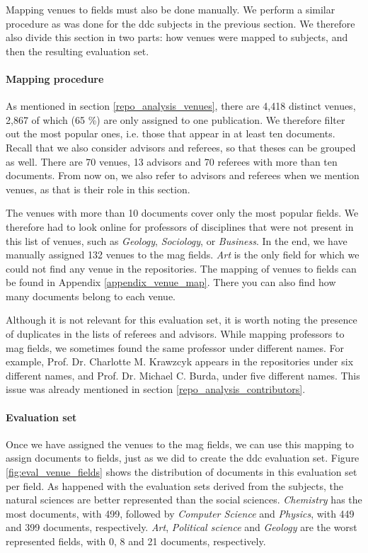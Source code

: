 Mapping venues to fields must also be done manually. We perform a similar procedure as was done for the \acrshort{ddc} subjects in the previous section. We therefore also divide this section in two parts: how venues were mapped to subjects, and then the resulting evaluation set.

\paragraph{Mapping procedure} \mbox{}

As mentioned in section \ref{repo_analysis_venues}, there are 4,418 distinct venues, 2,867 of which (65 \%) are only assigned to one publication. We therefore filter out the most popular ones, i.e. those that appear in at least ten documents. Recall that we also consider advisors and referees, so that theses can be grouped as well. There are 70 venues, 13 advisors and 70 referees with more than ten documents. From now on, we also refer to advisors and referees when we mention venues, as that is their role in this section.

The venues with more than 10 documents cover only the most popular fields. We therefore had to look online for professors of disciplines that were not present in this list of venues, such as \textit{Geology}, \textit{Sociology}, or \textit{Business}. In the end, we have manually assigned 132 venues to the \acrshort{mag} fields. \textit{Art} is the only field for which we could not find any venue in the repositories. The mapping of venues to fields can be found in Appendix \ref{appendix_venue_map}. There you can also find how many documents belong to each venue.

Although it is not relevant for this evaluation set, it is worth noting the presence of duplicates in the lists of referees and advisors. While mapping professors to \acrshort{mag} fields, we sometimes found the same professor under different names. For example, Prof. Dr. Charlotte M. Krawzcyk appears in the repositories under six different names, and Prof. Dr. Michael C. Burda, under five different names. This issue was already mentioned in section \ref{repo_analysis_contributors}.

\paragraph{Evaluation set} \mbox{}

Once we have assigned the venues to the \acrshort{mag} fields, we can use this mapping to assign documents to fields, just as we did to create the \acrshort{ddc} evaluation set. Figure \ref{fig:eval_venue_fields} shows the distribution of documents in this evaluation set per field. As happened with the evaluation sets derived from the subjects, the natural sciences are better represented than the social sciences. \textit{Chemistry} has the most documents, with 499, followed by \textit{Computer Science} and \textit{Physics}, with 449 and 399 documents, respectively. \textit{Art}, \textit{Political science} and \textit{Geology} are the worst represented fields, with 0, 8 and 21 documents, respectively.

